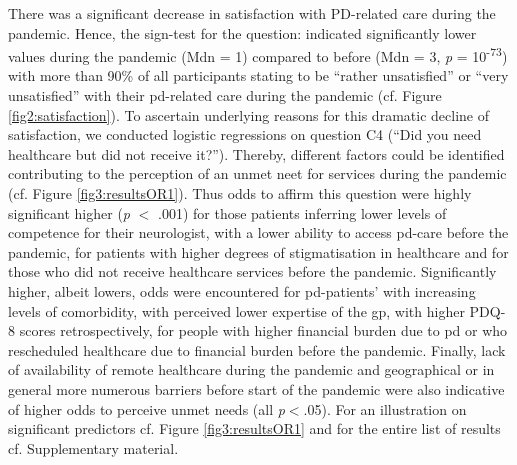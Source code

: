\documentclass{bmcart}
\begin{document}
There was a significant decrease in satisfaction with PD-related care during the pandemic. Hence, the sign-test for the question: %
indicated significantly lower values during the pandemic (Mdn = 1) compared to before (Mdn = 3, \textit{p} = 10\textsuperscript{-73}) with more than 90\% of all participants stating to be ``rather unsatisfied'' or ``very unsatisfied'' with their \ac{pd}-related care during the pandemic (cf. Figure \ref{fig2:satisfaction}). To ascertain underlying reasons for this dramatic decline of satisfaction, we conducted logistic regressions on question C4 (``Did you need healthcare but did not receive it?''). Thereby, different factors could be identified contributing to the perception of an unmet neet for services during the pandemic (cf. Figure \ref{fig3:resultsOR1}). Thus odds to affirm this question were highly significant higher (\textit{p} $<$ .001) for those patients inferring lower levels of competence for their neurologist, with a lower ability to access \ac{pd}-care before the pandemic, for patients with higher degrees of stigmatisation in healthcare and for those who did not receive healthcare services before the pandemic. Significantly higher, albeit lowers, odds were encountered for \ac{pd}-patients' with increasing levels of comorbidity, with perceived lower expertise of the \ac{gp}, with higher PDQ-8 scores retrospectively, for people with higher financial burden due to \ac{pd} or who rescheduled healthcare due to financial burden before the pandemic. Finally, lack of availability of remote healthcare during the pandemic and geographical or in general more numerous barriers before start of the pandemic were also indicative of higher odds to perceive unmet needs (all \textit{p}$<$.05). For an illustration on significant predictors cf. Figure \ref{fig3:resultsOR1} and for the entire list of results cf. Supplementary material. %
\end{document}
